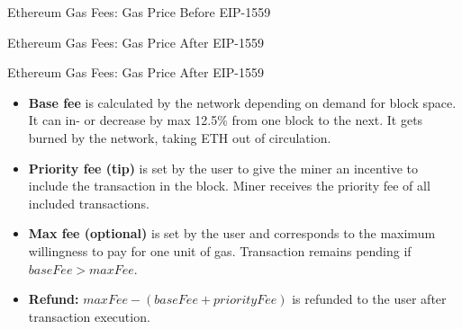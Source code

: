 \documentclass[]{beamer}
\begin{document}
\begin{frame}{Ethereum Gas Fees: Gas Price Before EIP-1559}
	\begin{center}
		\begin{tikzpicture}
			
		\end{tikzpicture}
	\end{center}
	
	\begin{itemize}
	\end{itemize}
\end{frame}

\begin{frame}{Ethereum Gas Fees: Gas Price After EIP-1559}
	\begin{center}
		\begin{tikzpicture}
			
		\end{tikzpicture}
	\end{center}	
\end{frame}

\begin{frame}{Ethereum Gas Fees: Gas Price After EIP-1559}
	\begin{itemize}
		\item \textbf{Base fee} is calculated by the network depending on demand for block space. It can in- or decrease by max 12.5\% from one block to the next. It gets burned by the network, taking ETH out of circulation.
		\item \textbf{Priority fee (tip)} is set by the user to give the miner an incentive to include the transaction in the block. Miner receives the priority fee of all included transactions.
		\item \textbf{Max fee (optional)} is set by the user and corresponds to the maximum willingness to pay for one unit of gas. Transaction remains pending if $baseFee > maxFee$.
		\item \textbf{Refund:} $maxFee - (baseFee + priorityFee)$ is refunded to the user after transaction execution. 
	\end{itemize}	
\end{frame}
\end{document}
